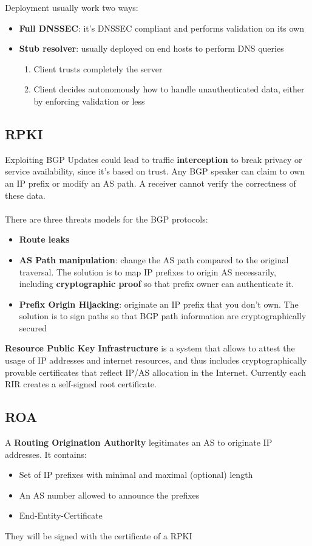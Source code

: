 \begin{observation}
	Deployment usually work two ways:
	\begin{itemize}
		\item \textbf{Full DNSSEC}: it's DNSSEC compliant and performs validation on its own
		\item \textbf{Stub resolver}: usually deployed on end hosts to perform DNS queries
		\begin{enumerate}
			\item Client trusts completely the server
			\item Client decides autonomously how to handle unauthenticated data, either by enforcing validation or less
		\end{enumerate}
	\end{itemize}
\end{observation}

\subsection{RPKI}
Exploiting BGP Updates could lead to traffic \textbf{interception} to break privacy or service availability, since it's based on trust. Any BGP speaker can claim to own an IP prefix or modify an AS path. A receiver cannot verify the correctness of these data. \\\\
There are three threats models for the BGP protocols:
\begin{itemize}
	\item \textbf{Route leaks}
	\item \textbf{AS Path manipulation}: change the AS path compared to the original traversal. The solution is to map IP prefixes to origin AS necessarily, including \textbf{cryptographic proof} so that prefix owner can authenticate it.
	\item \textbf{Prefix Origin Hijacking}: originate an IP prefix that you don't own. The solution is to sign paths so that BGP path information are cryptographically secured
\end{itemize}

\textbf{Resource Public Key Infrastructure} is a system that allows to attest the usage of IP addresses and internet resources, and thus includes cryptographically provable certificates that reflect IP/AS allocation in the Internet. Currently each RIR creates a self-signed root certificate.

\subsection{ROA}
A \textbf{Routing Origination Authority} legitimates an AS to originate IP addresses. It contains:
\begin{itemize}
	\item Set of IP prefixes with minimal and maximal (optional) length
	\item An AS number allowed to announce the prefixes
	\item End-Entity-Certificate
\end{itemize}
They will be signed with the certificate of a RPKI